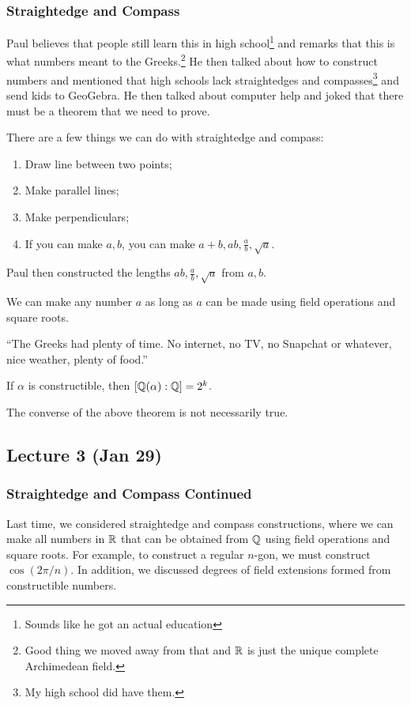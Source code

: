 \message{ !name(notes.tex)}\documentclass[10pt, twoside]{article}
\begin{document}
    \subsubsection{Straightedge and Compass}%
    Paul believes that people still learn this in high school\footnote{Sounds like he got an actual education} and remarks that this is what numbers meant to the Greeks.\footnote{Good thing we moved away from that and $\mathbb{R}$ is just the unique complete Archimedean field.} He then talked about how to construct numbers and mentioned that high schools lack straightedges and compasses\footnote{My high school did have them.} and send kids to GeoGebra. He then talked about computer help and joked that there must be a theorem that we need to prove.

    There are a few things we can do with straightedge and compass:
    \begin{enumerate}
        \item Draw line between two points;
        \item Make parallel lines;
        \item Make perpendiculars;
        \item If you can make $a,b$, you can make $a+b, ab, \frac{a}{b}, \sqrt{a}$.
    \end{enumerate}

    Paul then constructed the lengths $ab, \frac{a}{b}, \sqrt{a}$ from $a,b$.
    
    We can make any number $a$ as long as $a$ can be made using field operations and square roots.

    ``The Greeks had plenty of time. No internet, no TV, no Snapchat or whatever, nice weather, plenty of food.''

    \begin{thm}
        If $\alpha$ is constructible, then $[\mathbb{Q}(\alpha):\mathbb{Q}] = 2^k$.
    \end{thm}

    \begin{rmk}
        The converse of the above theorem is not necessarily true.
    \end{rmk}

    \subsection{Lecture 3 (Jan 29)}

    \subsubsection{Straightedge and Compass Continued}
    Last time, we considered straightedge and compass constructions, where we can make all numbers in $\mathbb{R}$ that can be obtained from $\mathbb{Q}$ using field operations and square roots. For example, to construct a regular $n$-gon, we must construct $\cos(2\pi/n)$. In addition, we discussed degrees of field extensions formed from constructible numbers.
\end{document}
